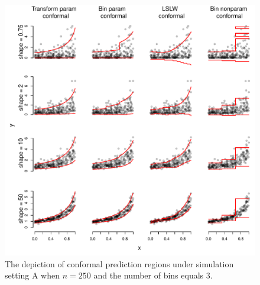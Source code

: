 \documentclass[11pt]{article}\usepackage[]{graphicx}\usepackage[]{color}
\makeatletter
\def\maxwidth{ %
  \ifdim\Gin@nat@width>\linewidth
    \linewidth
  \else
    \Gin@nat@width
  \fi
}
\newenvironment{knitrout}{}{} %
\makeatother
\begin{document}
\newpage
\begin{figure}[h!]
\begin{center}
\begin{knitrout}
\color{fgcolor}
\includegraphics[width=\maxwidth]{figure/conformal-plots-A-250-1} 

\end{knitrout}
\end{center}
\caption{The depiction of conformal prediction regions under simulation 
  setting A when $n = 250$ and the number of bins equals 3.
}
\label{conformal-plots-A-250}
\end{figure}
\end{document}
